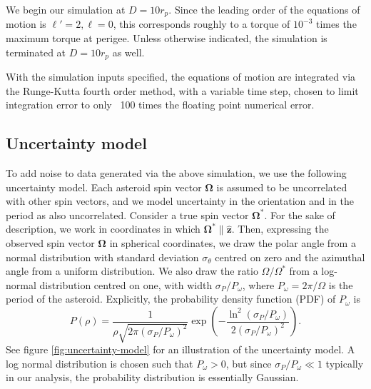 \documentclass[fleqn,usenatbib]{mnras}
\newcommand{\unit}[1]{\bm{\hat{#1}}}
\newcommand{\parens}[1]{\left( #1 \right)}
\newcommand{\brackets}[1]{\left[ #1 \right]}
\begin{document}
We begin our simulation at $D = 10 r_p$. Since the leading order of the equations of motion is $\ell' = 2, \ell = 0$, this corresponds roughly to a torque of $10^{-3}$ times the maximum torque at perigee. Unless otherwise indicated, the simulation is terminated at $D=10 r_p$ as well.

With the simulation inputs specified, the equations of motion are integrated via the Runge-Kutta fourth order method, with a variable time step, chosen to limit integration error to only ~100 times the floating point numerical error.



\subsection{Uncertainty model}
\label{sec:uncertainty}

To add noise to data generated via the above simulation, we use the following uncertainty model. Each asteroid spin vector $\bm \Omega$ is assumed to be uncorrelated with other spin vectors, and we model uncertainty in the orientation and in the period as also uncorrelated. Consider a true spin vector $\bm \Omega^*$. For the sake of description, we work in coordinates in which $\bm \Omega^* \parallel \unit z$. Then, expressing the observed spin vector $\bm \Omega$ in spherical coordinates, we draw the polar angle from a normal distribution with standard deviation $\sigma_\theta$ centred on zero and the azimuthal angle from a uniform distribution. We also draw the ratio $\Omega/\Omega^*$ from a log-normal distribution centred on one, with width $\sigma_P / P_\omega$, where $P_\omega = 2\pi / \Omega$ is the period of the asteroid. Explicitly, the probability density function (PDF) of $P_\omega$ is 
\begin{equation}
  P(\rho) = \frac{1}{\rho\sqrt{2\pi (\sigma_P / P_\omega)^2}} \exp\parens{-\frac{\ln^2(\sigma_P / P_\omega)}{2(\sigma_P / P_\omega)^2}}.
\end{equation}
See figure \ref{fig:uncertainty-model} for an illustration of the uncertainty model. A log normal distribution is chosen such that $P_\omega > 0$, but since $\sigma_P/P_\omega \ll 1$ typically in our analysis, the probability distribution is essentially Gaussian.
\end{document}
